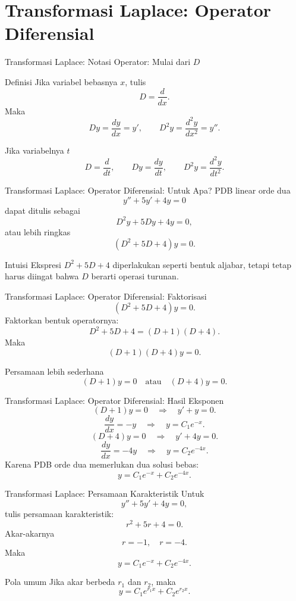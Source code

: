 \documentclass[aspectratio=169,11pt]{beamer}
\begin{document}
\section{Transformasi Laplace: Operator Diferensial}

\begin{frame}{Transformasi Laplace: Notasi Operator: Mulai dari $D$}
\begin{block}{Definisi}
Jika variabel bebasnya $x$, tulis
\[
D=\frac{d}{dx}.
\]
Maka
\[
Dy=\frac{dy}{dx}=y',\qquad D^2y=\frac{d^2y}{dx^2}=y''.
\]
\end{block}
\begin{block}{Jika variabelnya $t$}
\[
D=\frac{d}{dt},\qquad Dy=\frac{dy}{dt},\qquad D^2y=\frac{d^2y}{dt^2}.
\]
\end{block}
\end{frame}

\begin{frame}{Transformasi Laplace: Operator Diferensial: Untuk Apa?}
PDB linear orde dua
\[
y''+5y'+4y=0
\]
dapat ditulis sebagai
\[
D^2y+5Dy+4y=0,
\]
atau lebih ringkas
\[
(D^2+5D+4)y=0.
\]
\begin{alertblock}{Intuisi}
Ekspresi $D^2+5D+4$ diperlakukan seperti bentuk aljabar, tetapi tetap harus diingat bahwa $D$ berarti operasi turunan.
\end{alertblock}
\end{frame}

\begin{frame}{Transformasi Laplace: Operator Diferensial: Faktorisasi}
\[
(D^2+5D+4)y=0.
\]
Faktorkan bentuk operatornya:
\[
D^2+5D+4=(D+1)(D+4).
\]
Maka
\[
(D+1)(D+4)y=0.
\]
\begin{block}{Persamaan lebih sederhana}
\[
(D+1)y=0 \quad \text{atau} \quad (D+4)y=0.
\]
\end{block}
\end{frame}

\begin{frame}{Transformasi Laplace: Operator Diferensial: Hasil Eksponen}
\[
(D+1)y=0 \quad \Rightarrow \quad y'+y=0.
\]
\[
\frac{dy}{dx}=-y \quad \Rightarrow \quad y=C_1e^{-x}.
\]
\[
(D+4)y=0 \quad \Rightarrow \quad y'+4y=0.
\]
\[
\frac{dy}{dx}=-4y \quad \Rightarrow \quad y=C_2e^{-4x}.
\]
Karena PDB orde dua memerlukan dua solusi bebas:
\[
\boxed{y=C_1e^{-x}+C_2e^{-4x}.}
\]
\end{frame}

\begin{frame}{Transformasi Laplace: Persamaan Karakteristik}
Untuk
\[
y''+5y'+4y=0,
\]
tulis persamaan karakteristik:
\[
r^2+5r+4=0.
\]
Akar-akarnya
\[
r=-1,\quad r=-4.
\]
Maka
\[
y=C_1e^{-x}+C_2e^{-4x}.
\]
\begin{block}{Pola umum}
Jika akar berbeda $r_1$ dan $r_2$, maka
\[
y=C_1e^{r_1x}+C_2e^{r_2x}.
\]
\end{block}
\end{frame}
\end{document}
